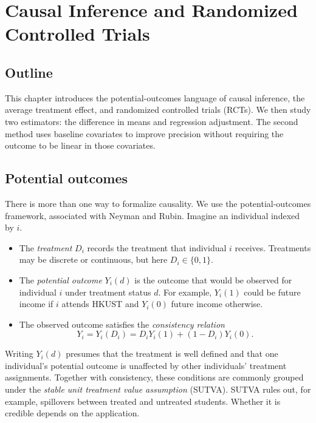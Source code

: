 \chapter{Causal Inference and Randomized Controlled Trials}
\label{chap:rct}

\section*{Outline}

This chapter introduces the potential-outcomes language of causal inference, the
average treatment effect, and randomized controlled trials (RCTs).  We then study
two estimators: the difference in means and regression adjustment.  The second
method uses baseline covariates to improve precision without requiring the outcome
to be linear in those covariates.

\section{Potential outcomes}
\label{sec:rct-potential-outcomes}

There is more than one way to formalize causality.  We use the potential-outcomes
framework, associated with Neyman and Rubin.  Imagine an individual indexed by
$i$.

\begin{itemize}
  \item The \emph{treatment} $D_i$ records the treatment that individual $i$
  receives.  Treatments may be discrete or continuous, but here
  $D_i\in\{0,1\}$.
  \item The \emph{potential outcome} $Y_i(d)$ is the outcome that would be
  observed for individual $i$ under treatment status $d$.
  For example, $Y_i(1)$ could be future income if $i$ attends HKUST and
  $Y_i(0)$ future income otherwise.
  \item The observed outcome satisfies the \emph{consistency relation}
  \begin{equation}
    Y_i=Y_i(D_i)=D_iY_i(1)+(1-D_i)Y_i(0).
    \label{eq:rct-consistency}
  \end{equation}
\end{itemize}

Writing $Y_i(d)$ presumes that the treatment is well defined and that one
individual's potential outcome is unaffected by other individuals' treatment
assignments.  Together with consistency, these conditions are commonly grouped
under the \emph{stable unit treatment value assumption} (SUTVA).  SUTVA rules out,
for example, spillovers between treated and untreated students.  Whether it is
credible depends on the application.

